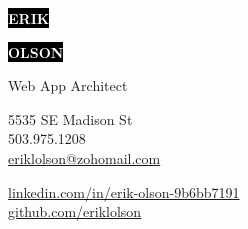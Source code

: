 \documentclass[9pt]{developercv} %
\begin{document}

\begin{minipage}[t]{0.45\textwidth} %
	\vspace{-\baselineskip} %
	
	\colorbox{black}{{\HUGE\textcolor{white}{\textbf{\MakeUppercase{Erik}}}}} %
	
	\colorbox{black}{{\HUGE\textcolor{white}{\textbf{\MakeUppercase{Olson}}}}} %
	
	\vspace{6pt}
	
	{\huge Web App Architect} %
\end{minipage}
\begin{minipage}[t]{0.275\textwidth} %
	\vspace{-\baselineskip} %
	
	{5535 SE Madison St}\\
	{503.975.1208}\\
	{\href{mailto:eriklolson@zohomail.com}{eriklolson@zohomail.com}}\\	
\end{minipage}
\begin{minipage}[t]{0.275\textwidth} %
	\vspace{-\baselineskip} %
	
	{\href{https://linkedin.com/in/erik-olson-9b6bb7191}{linkedin.com/in/erik-olson-9b6bb7191}}\\
	{\href{https://github.com/eriklolson}{github.com/eriklolson}}\\
\end{minipage}
\end{document}
